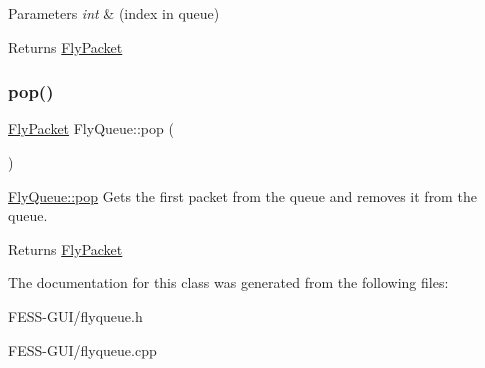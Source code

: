 \begin{DoxyParams}{Parameters}
{\em int} & (index in queue) \\
\hline
\end{DoxyParams}
\begin{DoxyReturn}{Returns}
\hyperlink{class_fly_packet}{Fly\+Packet} 
\end{DoxyReturn}
\hypertarget{class_fly_queue_a96b802276ccd6ce04c42da2765001603}{}\label{class_fly_queue_a96b802276ccd6ce04c42da2765001603} 
\subsubsection{\texorpdfstring{pop()}{pop()}}
{\footnotesize\ttfamily \hyperlink{class_fly_packet}{Fly\+Packet} Fly\+Queue\+::pop (\begin{DoxyParamCaption}{ }\end{DoxyParamCaption})}



\hyperlink{class_fly_queue_a96b802276ccd6ce04c42da2765001603}{Fly\+Queue\+::pop} Gets the first packet from the queue and removes it from the queue. 

\begin{DoxyReturn}{Returns}
\hyperlink{class_fly_packet}{Fly\+Packet} 
\end{DoxyReturn}


The documentation for this class was generated from the following files\+:\begin{DoxyCompactItemize}
\item 
F\+E\+S\+S-\/\+G\+U\+I/flyqueue.\+h\item 
F\+E\+S\+S-\/\+G\+U\+I/flyqueue.\+cpp\end{DoxyCompactItemize}
